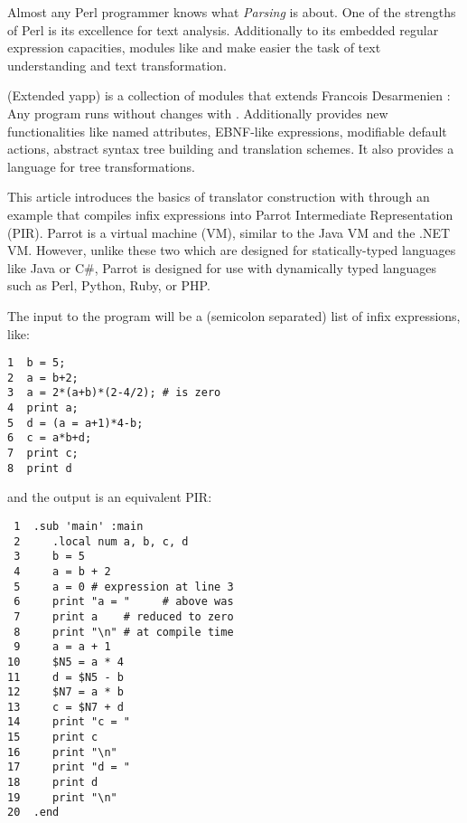 Almost any Perl programmer knows what {\it Parsing} is about.
One of the strengths of Perl is its excellence for text analysis. 
Additionally to its embedded regular expression capacities, modules 
like  \cite{conwayrd} and 
 \cite{desarmenien} make easier the task of text 
understanding and text transformation.

 (Extended yapp) is a collection of modules
that extends Francois Desarmenien  :
Any  program runs without changes with .
Additionally  provides new 
functionalities like named attributes,
EBNF-like expressions, modifiable default actions,
abstract syntax tree building and translation schemes. 
It also provides a language for tree transformations.

This article introduces the basics of 
translator construction with  through an
example that compiles infix expressions into Parrot 
Intermediate Representation (PIR)\cite{randal04}.
Parrot is a virtual machine (VM), similar to the Java VM and the
.NET VM. However, unlike these two which are designed for
statically-typed languages like Java or C\#, Parrot is designed for
use with dynamically typed languages such as Perl, Python, Ruby,
or PHP.

The input to the program will be a (semicolon separated)
list of infix expressions, like:

\begin{verbatim}
1  b = 5;
2  a = b+2;
3  a = 2*(a+b)*(2-4/2); # is zero
4  print a;
5  d = (a = a+1)*4-b;
6  c = a*b+d;
7  print c;
8  print d
\end{verbatim}

and the output is an equivalent
PIR: 
\begin{verbatim}
 1  .sub 'main' :main
 2     .local num a, b, c, d
 3     b = 5
 4     a = b + 2
 5     a = 0 # expression at line 3 
 6     print "a = "     # above was
 7     print a    # reduced to zero
 8     print "\n" # at compile time
 9     a = a + 1
10     $N5 = a * 4
11     d = $N5 - b
12     $N7 = a * b
13     c = $N7 + d
14     print "c = "
15     print c
16     print "\n"
17     print "d = "
18     print d
19     print "\n"
20  .end
\end{verbatim}

